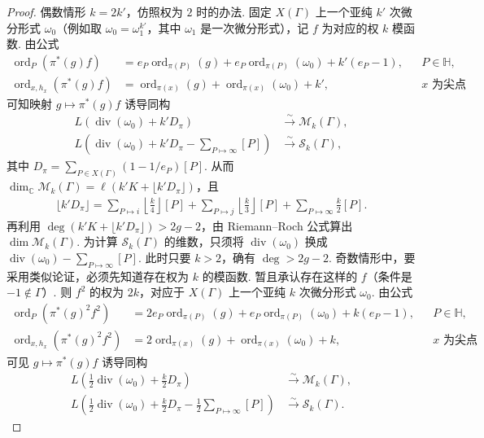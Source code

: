 \begin{proof}
偶数情形 $k=2k'$，仿照权为 $2$ 时的办法. 固定 $X(\Gamma)$ 上一个亚纯 $k'$ 次微分形式 $\omega_0$（例如取 $\omega_0=\omega_1^{k'}$，其中 $\omega_1$ 是一次微分形式），记 $f$ 为对应的权 $k$ 模函数. 由公式
\begin{align*}
\operatorname{ord}_P(\pi^*(g)f)&=e_P\operatorname{ord}_{\pi(P)}(g)+e_P\operatorname{ord}_{\pi(P)}(\omega_0)+k'(e_P-1),&&P\in\mathbb H,\\
\operatorname{ord}_{x,h_x}(\pi^*(g)f)&=\operatorname{ord}_{\pi(x)}(g)+\operatorname{ord}_{\pi(x)}(\omega_0)+k',&&x\text{ 为尖点},
\end{align*}
可知映射 $g\mapsto\pi^*(g)f$ 诱导同构
\begin{align*}
L(\operatorname{div}(\omega_0)+k'D_\pi)&\xrightarrow{\sim}\mathcal M_k(\Gamma),\\
L\left(\operatorname{div}(\omega_0)+k'D_\pi-\sum_{P\mapsto\infty}[P]\right)&\xrightarrow{\sim}\mathcal S_k(\Gamma),
\end{align*}
其中 $D_\pi=\sum_{P\in X(\Gamma)}(1-1/e_P)[P]$. 从而 $\dim_{\mathbb C}\mathcal M_k(\Gamma)=\ell(k'K+\lfloor k'D_\pi\rfloor)$，且
\begin{align*}
\lfloor k'D_\pi\rfloor=\sum_{P\mapsto i}\left\lfloor\frac k4\right\rfloor[P]+\sum_{P\mapsto j}\left\lfloor\frac k3\right\rfloor[P]+\sum_{P\mapsto\infty}\frac k2[P].
\end{align*}
再利用 $\deg(k'K+\lfloor k'D_\pi\rfloor)>2g-2$，由 Riemann--Roch 公式算出 $\dim\mathcal M_k(\Gamma)$. 为计算 $\mathcal S_k(\Gamma)$ 的维数，只须将 $\operatorname{div}(\omega_0)$ 换成 $\operatorname{div}(\omega_0)-\sum_{P\mapsto\infty}[P]$. 此时只要 $k>2$，确有 $\deg>2g-2$.
奇数情形中，要采用类似论证，必须先知道存在权为 $k$ 的模函数. 暂且承认存在这样的 $f$（条件是 $-1\notin\Gamma$）. 则 $f^2$ 的权为 $2k$，对应于 $X(\Gamma)$ 上一个亚纯 $k$ 次微分形式 $\omega_0$. 由公式
\begin{align*}
\operatorname{ord}_P(\pi^*(g)^2f^2)&=2e_P\operatorname{ord}_{\pi(P)}(g)+e_P\operatorname{ord}_{\pi(P)}(\omega_0)+k(e_P-1),&&P\in\mathbb H,\\
\operatorname{ord}_{x,h_x}(\pi^*(g)^2f^2)&=2\operatorname{ord}_{\pi(x)}(g)+\operatorname{ord}_{\pi(x)}(\omega_0)+k,&&x\text{ 为尖点},
\end{align*}
可见 $g\mapsto\pi^*(g)f$ 诱导同构
\begin{align*}
L\left(\tfrac12\operatorname{div}(\omega_0)+\tfrac k2D_\pi\right)&\xrightarrow{\sim}\mathcal M_k(\Gamma),\\
L\left(\tfrac12\operatorname{div}(\omega_0)+\tfrac k2D_\pi-\tfrac12\sum_{P\mapsto\infty}[P]\right)&\xrightarrow{\sim}\mathcal S_k(\Gamma).

\end{align*}
\end{proof}
